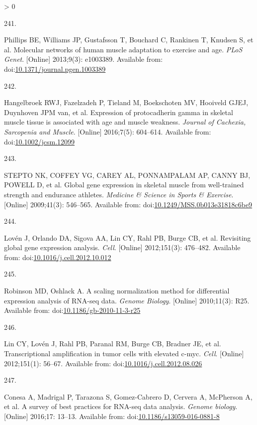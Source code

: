 \documentclass[twoside,10pt]{gihclass} %
\newlength{\cslhangindent}
\newlength{\csllabelwidth}
\newenvironment{CSLReferences}[3] %
 {%
  \setlength{\parindent}{0pt}
  \ifodd #1 \everypar{\setlength{\hangindent}{\cslhangindent}}\ignorespaces\fi
  \ifnum #2 > 0
  \setlength{\parskip}{#2\baselineskip}
  \fi
 }%
 {}
\newcommand{\CSLLeftMargin}[1]{\parbox[t]{\maxof{\widthof{#1}}{\csllabelwidth}}{#1}}
\newcommand{\CSLRightInline}[1]{\parbox[t]{\linewidth}{#1}}
\begin{document}
\begin{CSLReferences}{0}{0}
\leavevmode\hypertarget{ref-RN753}{}%
\CSLLeftMargin{241. }
\CSLRightInline{Phillips BE, Williams JP, Gustafsson T, Bouchard C, Rankinen T, Knudsen S, et al. Molecular networks of human muscle adaptation to exercise and age. \emph{PLoS Genet}. {[}Online{]} 2013;9(3): e1003389. Available from: doi:\href{https://doi.org/10.1371/journal.pgen.1003389}{10.1371/journal.pgen.1003389}}

\leavevmode\hypertarget{ref-RN2402}{}%
\CSLLeftMargin{242. }
\CSLRightInline{Hangelbroek RWJ, Fazelzadeh P, Tieland M, Boekschoten MV, Hooiveld GJEJ, Duynhoven JPM van, et al. Expression of protocadherin gamma in skeletal muscle tissue is associated with age and muscle weakness. \emph{Journal of Cachexia, Sarcopenia and Muscle}. {[}Online{]} 2016;7(5): 604--614. Available from: doi:\href{https://doi.org/10.1002/jcsm.12099}{10.1002/jcsm.12099}}

\leavevmode\hypertarget{ref-RN2398}{}%
\CSLLeftMargin{243. }
\CSLRightInline{STEPTO NK, COFFEY VG, CAREY AL, PONNAMPALAM AP, CANNY BJ, POWELL D, et al. Global gene expression in skeletal muscle from well-trained strength and endurance athletes. \emph{Medicine \& Science in Sports \& Exercise}. {[}Online{]} 2009;41(3): 546--565. Available from: doi:\href{https://doi.org/10.1249/MSS.0b013e31818c6be9}{10.1249/MSS.0b013e31818c6be9}}

\leavevmode\hypertarget{ref-RN2359}{}%
\CSLLeftMargin{244. }
\CSLRightInline{Lovén J, Orlando DA, Sigova AA, Lin CY, Rahl PB, Burge CB, et al. Revisiting global gene expression analysis. \emph{Cell}. {[}Online{]} 2012;151(3): 476--482. Available from: doi:\href{https://doi.org/10.1016/j.cell.2012.10.012}{10.1016/j.cell.2012.10.012}}

\leavevmode\hypertarget{ref-RN2414}{}%
\CSLLeftMargin{245. }
\CSLRightInline{Robinson MD, Oshlack A. A scaling normalization method for differential expression analysis of RNA-seq data. \emph{Genome Biology}. {[}Online{]} 2010;11(3): R25. Available from: doi:\href{https://doi.org/10.1186/gb-2010-11-3-r25}{10.1186/gb-2010-11-3-r25}}

\leavevmode\hypertarget{ref-RN2430}{}%
\CSLLeftMargin{246. }
\CSLRightInline{Lin CY, Lovén J, Rahl PB, Paranal RM, Burge CB, Bradner JE, et al. Transcriptional amplification in tumor cells with elevated c-myc. \emph{Cell}. {[}Online{]} 2012;151(1): 56--67. Available from: doi:\href{https://doi.org/10.1016/j.cell.2012.08.026}{10.1016/j.cell.2012.08.026}}

\leavevmode\hypertarget{ref-RN2426}{}%
\CSLLeftMargin{247. }
\CSLRightInline{Conesa A, Madrigal P, Tarazona S, Gomez-Cabrero D, Cervera A, McPherson A, et al. A survey of best practices for RNA-seq data analysis. \emph{Genome biology}. {[}Online{]} 2016;17: 13--13. Available from: doi:\href{https://doi.org/10.1186/s13059-016-0881-8}{10.1186/s13059-016-0881-8}}


\end{CSLReferences}
\end{document}
